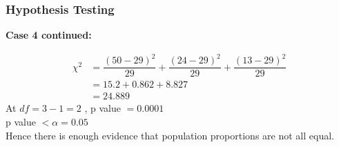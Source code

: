 \documentclass{beamer}
\begin{document}
\begin{frame}
    \frametitle{Hypothesis Testing}
    \begin{block}{\textbf{Case 4 continued:}}

        \begin{equation}
            \begin{aligned}
                \chi^{2} & = \dfrac{(50 - 29)^{2}}{29} + \dfrac{(24
                    -29)^{2}}{29} +
                \dfrac{(13 -29)^{2}}{29}
                \\
                         & = 15.2 + 0.862 + 8.827
                \\
                         & = 24.889
            \end{aligned}
        \end{equation}
        At $df = 3 - 1 = 2 $ , p value $= 0.0001  $\\
        p value $< \alpha = 0.05$\\
        Hence there is enough evidence that population proportions are not all
        equal.

    \end{block}
\end{frame}

\end{document}
